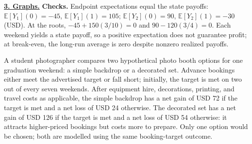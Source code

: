 \vspace{-3mm}
\textbf{\underline{3. Graphs.}}\vspace{-3mm}
\textbf{Checks.} Endpoint expectations equal the state payoffs:
$\mathbb E[Y_1](0)=-45$, $\mathbb E[Y_1](1)=105$;
$\mathbb E[Y_2](0)=90$, $\mathbb E[Y_2](1)=-30$ (USD).
At the roots, $-45+150(3/10)=0$ and $90-120(3/4)=0$.
Each weekend yields a state payoff, so a positive expectation does not guarantee profit;
at break-even, the long-run average is zero despite nonzero realized payoffs.

A student photographer compares two hypothetical photo booth options for one graduation
weekend: a simple backdrop or a decorated set. Advance bookings either meet the advertised
target or fall short; initially, the target is met on two out of every seven weekends.
After equipment hire, decorations, printing, and travel costs as applicable, the simple
backdrop has a net gain of USD 72 if the target is met and a net loss of USD 24 otherwise.
The decorated set has a net gain of USD 126 if the target is met and a net loss of USD 54
otherwise: it attracts higher-priced bookings but costs more to prepare. Only one option
would be chosen; both are modelled using the same booking-target outcome.


